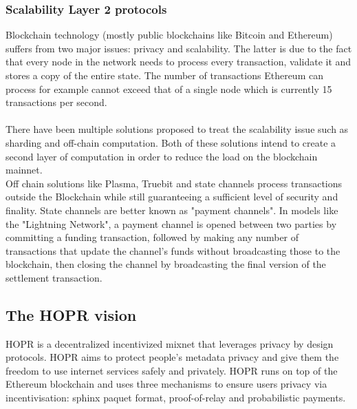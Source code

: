 \subsubsection{Scalability Layer 2 protocols}
Blockchain technology (mostly public blockchains like Bitcoin and Ethereum) suffers from two major issues: privacy and scalability. The latter is due to the fact that every node in the network needs to process every transaction, validate it and stores a copy of the entire state. The number of transactions Ethereum can process for example cannot exceed that of a single node which is currently 15 transactions per second.
\\~\\There have been multiple solutions proposed to treat the scalability issue such as sharding and off-chain computation. Both of these solutions intend to create a second layer of computation in order to reduce the load on the blockchain mainnet.
\\Off chain solutions like Plasma, Truebit and state channels process transactions outside the Blockchain while still guaranteeing a sufficient level of security and finality. State channels are better known as "payment channels". In models like the "Lightning Network", a payment channel is opened between two parties by committing a funding transaction, followed by making any number of transactions that update the channel's funds without broadcasting those to the blockchain, then closing the channel by broadcasting the final version of the settlement transaction.
\subsection{The HOPR vision}
HOPR is a decentralized incentivized mixnet that leverages privacy by design protocols. HOPR aims to protect people's metadata privacy and give them the freedom to use internet services safely and privately. HOPR runs on top of the Ethereum blockchain and uses three mechanisms to ensure users privacy via incentivisation: sphinx paquet format, proof-of-relay and probabilistic payments.




 





